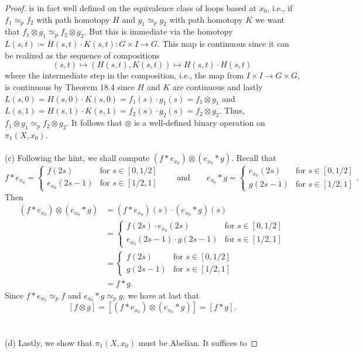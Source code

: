 \begin{proof}
is in fact well defined on the equivalence class of loops based at $x_0$,
i.e., if $f_1\simeq_p f_2$ with path homotopy $H$ and $g_1\simeq_p g_2$
with path homotopy $K$ we want that $f_1\otimes g_1\simeq_p f_2\otimes
g_2$. But this is immediate via the homotopy $L(s,t)\coloneqq H(s,t)\cdot
K(s,t)\colon G\times I\to G$. This map is continuous since it can be
realized as the sequence of compositions
\[
(s,t)\longmapsto (H(s,t),K(s,t))\longmapsto H(s,t)\cdot H(s,t)
\]
where the intermediate step in the composition, i.e., the map from $I\times
I\to G\times G$, is continuous by Theorem 18.4 since $H$ and $K$ are
continuous and lastly $L(s,0)=H(s,0)\cdot K(s,0)=f_1(s)\cdot
g_1(s)=f_1\otimes g_1$ and $L(s,1)=H(s,1)\cdot K(s,1)=f_2(s)\cdot
g_2(s)=f_2\otimes g_2$. Thus, $f_1\otimes g_1\simeq_p f_2\otimes g_2$. It
follows that $\otimes$ is a well-defined binary operation on
$\pi_1(X,x_0)$.
\\\\
(c) Following the hint, we shall compute $(f*e_{x_0})\otimes(e_{x_0}*g)$.
Recall that
\[
f*e_{x_0}=
\begin{cases}
f(2s)&\text{for $s\in[0,1/2]$}\\
e_{x_0}(2s-1)&\text{for $s\in[1/2,1]$}
\end{cases}
\qquad\text{and}\qquad
e_{x_0}*g=
\begin{cases}
e_{x_0}(2s)&\text{for $s\in[0,1/2]$}\\
g(2s-1)&\text{for $s\in[1/2,1]$}
\end{cases}.
\]
Then
\begin{align*}
(f*e_{x_0})\otimes(e_{x_0}*g)
&=(f*e_{x_0})(s)\cdot (e_{x_0}*g)(s)\\
&=
\begin{cases}
f(2s)\cdot e_{x_0}(2s)&\text{for $s\in[0,1/2]$}\\
e_{x_0}(2s-1)\cdot g(2s-1)&\text{for $s\in[1/2,1]$}
\end{cases}\\
&=
\begin{cases}
f(2s)&\text{for $s\in[0,1/2]$}\\
g(2s-1)&\text{for $s\in[1/2,1]$}
\end{cases}\\
&=f*g.
\end{align*}
Since $f*e_{x_0}\simeq_p f$ and $e_{x_0}*g\simeq_p g$, we have at last that
\[
[f\otimes g]=[(f*e_{x_0})\otimes(e_{x_0}*g)]=[f*g].
\]
\\\\
(d) Lastly, we show that $\pi_1(X,x_0)$ must be Abelian. It suffices to

\end{proof}
